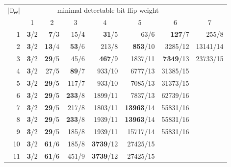 
\begin{table}%
	\footnotesize
	\setlength{\tabcolsep}{0.7em} %
	\begin{tabular}{r|rrrrrrr}
		\toprule
		\multirow{2}{*}{\(|\mathbb{D}_\Theta|\)} & \multicolumn{6}{c}{minimal detectable bit flip weight} \\
		   & \multicolumn{1}{c}{1} & \multicolumn{1}{c}{2} & \multicolumn{1}{c}{3} & \multicolumn{1}{c}{4} & \multicolumn{1}{c}{5} & \multicolumn{1}{c}{6} & \multicolumn{1}{c}{7} \\
		\midrule
		 1 & \textbf{3}/2 &  \textbf{7}/3 &            15/4 &    \textbf{31}/5 &              63/6 &   \textbf{127}/7 &    255/8  \\
		 2 & \textbf{3}/2 & \textbf{13}/4 &   \textbf{53}/6 &            213/8 &   \textbf{853}/10 &          3285/12 & 13141/14  \\
		 3 & \textbf{3}/2 & \textbf{29}/5 &            45/6 &   \textbf{467}/9 &           1837/11 & \textbf{7349}/13 & 23733/15 \\
		 4 & \textbf{3}/2 &          27/5 &   \textbf{89}/7 &           933/10 &           6777/13 &         31385/15 \\
		 5 & \textbf{3}/2 & \textbf{29}/5 &           117/7 &           933/10 &           7085/13 &         31373/15 \\
		 6 & \textbf{3}/2 & \textbf{29}/5 &  \textbf{233}/8 &          1899/11 &           7837/13 &         62739/16 \\
		 7 & \textbf{3}/2 & \textbf{29}/5 &           217/8 &          1803/11 & \textbf{13963}/14 &         55831/16 \\
		 8 & \textbf{3}/2 & \textbf{29}/5 &  \textbf{233}/8 &          1939/11 & \textbf{13963}/14 &         55831/16 \\
		 9 & \textbf{3}/2 & \textbf{29}/5 &           185/8 &          1939/11 &          15717/14 &         55831/16 \\
		10 & \textbf{3}/2 & \textbf{61}/6 &           185/8 & \textbf{3739}/12 &          27425/15 \\
		11 & \textbf{3}/2 & \textbf{61}/6 &           451/9 & \textbf{3739}/12 &          27425/15 \\

\end{tabular}
\end{table}
